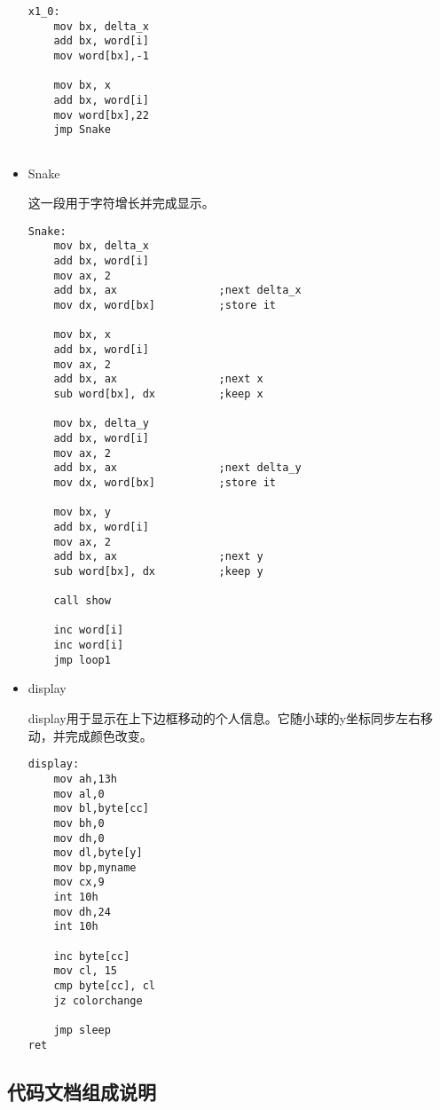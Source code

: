 \documentclass[a4paper,11pt,UTF8]{ctexart}
\begin{document}
\begin{itemize}
	\begin{lstlisting}[caption={SStone\_beta.asm x1\_0段},tabsize=4,basicstyle=\footnotesize,captionpos=b]
x1_0:
	mov bx, delta_x
	add bx, word[i]
	mov word[bx],-1
	
	mov bx, x
	add bx, word[i]
	mov word[bx],22	
	jmp Snake
	
	\end{lstlisting}
	
	
	\item Snake
	
	这一段用于字符增长并完成显示。
	\begin{lstlisting}[caption={SStone\_beta.asm Snake段},tabsize=4,basicstyle=\footnotesize,captionpos=b]
Snake:
	mov bx, delta_x
	add bx, word[i]
	mov ax, 2
	add bx, ax                ;next delta_x
	mov dx, word[bx]          ;store it
	
	mov bx, x
	add bx, word[i]
	mov ax, 2
	add bx, ax 				  ;next x
	sub word[bx], dx 		  ;keep x
	
	mov bx, delta_y
	add bx, word[i]
	mov ax, 2
	add bx, ax 				  ;next delta_y
	mov dx, word[bx] 		  ;store it
	
	mov bx, y
	add bx, word[i]
	mov ax, 2
	add bx, ax 				  ;next y
	sub word[bx], dx 		  ;keep y
	
	call show
	
	inc word[i]
	inc word[i]
	jmp loop1
	\end{lstlisting}
	
	\item display
	
	display用于显示在上下边框移动的个人信息。它随小球的y坐标同步左右移动，并完成颜色改变。

		\begin{lstlisting}[caption={SStone\_beta.asm display段},tabsize=4,basicstyle=\footnotesize,captionpos=b]
display:
	mov ah,13h
	mov al,0
	mov bl,byte[cc]
	mov bh,0
	mov dh,0
	mov dl,byte[y]
	mov bp,myname
	mov cx,9
	int 10h
	mov dh,24
	int 10h
	
	inc byte[cc]
	mov cl, 15
	cmp byte[cc], cl
	jz colorchange
	
	jmp sleep
ret
		\end{lstlisting}
	
	\end{itemize}

\subsection{代码文档组成说明}
\end{document}
